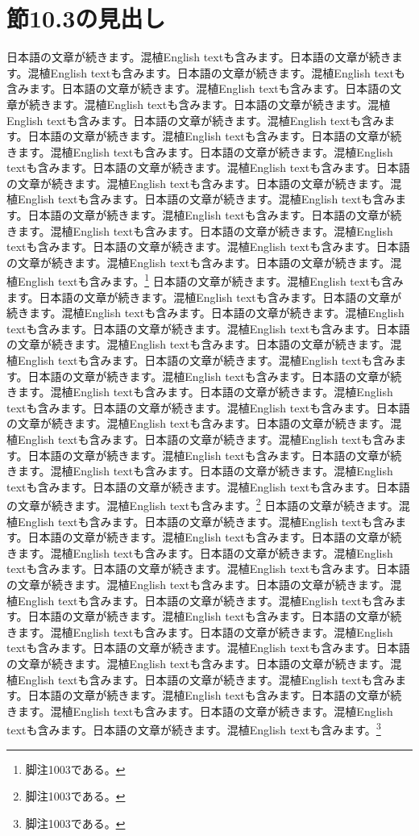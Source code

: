 \documentclass[pdflatex,book]{jlreq}
\begin{document}
\section{節10.3の見出し}
日本語の文章が続きます。混植English textも含みます。日本語の文章が続きます。混植English textも含みます。日本語の文章が続きます。混植English textも含みます。日本語の文章が続きます。混植English textも含みます。日本語の文章が続きます。混植English textも含みます。日本語の文章が続きます。混植English textも含みます。日本語の文章が続きます。混植English textも含みます。日本語の文章が続きます。混植English textも含みます。日本語の文章が続きます。混植English textも含みます。日本語の文章が続きます。混植English textも含みます。日本語の文章が続きます。混植English textも含みます。日本語の文章が続きます。混植English textも含みます。日本語の文章が続きます。混植English textも含みます。日本語の文章が続きます。混植English textも含みます。日本語の文章が続きます。混植English textも含みます。日本語の文章が続きます。混植English textも含みます。日本語の文章が続きます。混植English textも含みます。日本語の文章が続きます。混植English textも含みます。日本語の文章が続きます。混植English textも含みます。日本語の文章が続きます。混植English textも含みます。\footnote{脚注1003である。}
日本語の文章が続きます。混植English textも含みます。日本語の文章が続きます。混植English textも含みます。日本語の文章が続きます。混植English textも含みます。日本語の文章が続きます。混植English textも含みます。日本語の文章が続きます。混植English textも含みます。日本語の文章が続きます。混植English textも含みます。日本語の文章が続きます。混植English textも含みます。日本語の文章が続きます。混植English textも含みます。日本語の文章が続きます。混植English textも含みます。日本語の文章が続きます。混植English textも含みます。日本語の文章が続きます。混植English textも含みます。日本語の文章が続きます。混植English textも含みます。日本語の文章が続きます。混植English textも含みます。日本語の文章が続きます。混植English textも含みます。日本語の文章が続きます。混植English textも含みます。日本語の文章が続きます。混植English textも含みます。日本語の文章が続きます。混植English textも含みます。日本語の文章が続きます。混植English textも含みます。日本語の文章が続きます。混植English textも含みます。日本語の文章が続きます。混植English textも含みます。\footnote{脚注1003である。}
日本語の文章が続きます。混植English textも含みます。日本語の文章が続きます。混植English textも含みます。日本語の文章が続きます。混植English textも含みます。日本語の文章が続きます。混植English textも含みます。日本語の文章が続きます。混植English textも含みます。日本語の文章が続きます。混植English textも含みます。日本語の文章が続きます。混植English textも含みます。日本語の文章が続きます。混植English textも含みます。日本語の文章が続きます。混植English textも含みます。日本語の文章が続きます。混植English textも含みます。日本語の文章が続きます。混植English textも含みます。日本語の文章が続きます。混植English textも含みます。日本語の文章が続きます。混植English textも含みます。日本語の文章が続きます。混植English textも含みます。日本語の文章が続きます。混植English textも含みます。日本語の文章が続きます。混植English textも含みます。日本語の文章が続きます。混植English textも含みます。日本語の文章が続きます。混植English textも含みます。日本語の文章が続きます。混植English textも含みます。日本語の文章が続きます。混植English textも含みます。\footnote{脚注1003である。}
\end{document}
